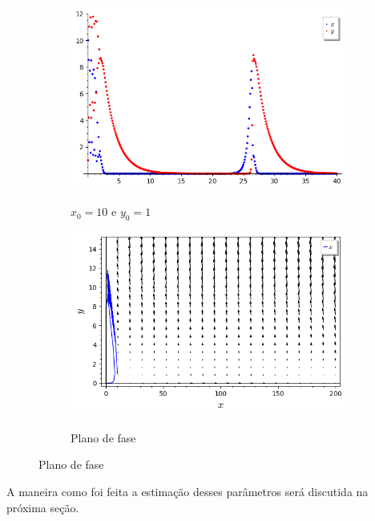 \begin{figure}[H]
    \centering
    \begin{subfigure}{0.4\textwidth}
        \includegraphics[scale=0.48]{figuras/RM-citros (10,1) plot.png}
        \label{fig:RM-citros_5}
        \caption{$x_0 = 10$ e $y_0 = 1$}
    \end{subfigure}
    \begin{subfigure}{0.4\textwidth}
        \includegraphics[scale=0.48]{figuras/RM-citros (10,1) plano.png}
        \label{fig:RM-citros_6}
        \caption{Plano de fase}
    \end{subfigure}
\end{figure}

A maneira como foi feita a estimação desses parâmetros será discutida na próxima seção.

